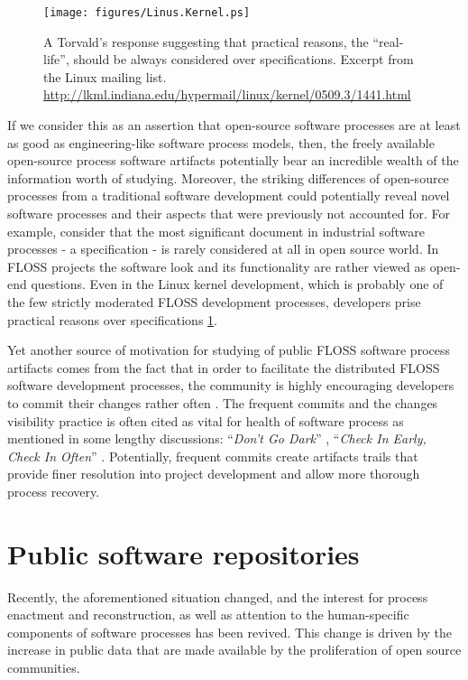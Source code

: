\begin{figure}[ht!]
   \centering
   \texttt{[image: figures/Linus.Kernel.ps]}
   \caption{A Torvald's response suggesting that practical reasons, the ``real-life'', should be always considered 
   over specifications.
   Excerpt from the Linux mailing list. \url{http://lkml.indiana.edu/hypermail/linux/kernel/0509.3/1441.html}}
   \label{fig:kernel}
\end{figure}

If we consider this as an assertion that open-source software processes are at least as good as engineering-like 
software process models, then, the freely available open-source process software artifacts potentially bear an 
incredible wealth of the information worth of studying. Moreover, the striking differences of open-source processes 
from a traditional software development could potentially reveal novel software processes and their aspects that 
were previously not accounted for. 
For example, consider that the most significant document in industrial software processes - a specification - 
is rarely considered at all in open source world. In FLOSS projects the software look and its functionality are 
rather viewed as open-end questions. Even in the Linux kernel development, which is probably one of the few strictly 
moderated FLOSS development processes, developers prise practical reasons over specifications 
\ref{fig:kernel}.

Yet another source of motivation for studying of public FLOSS software process artifacts comes from the fact that 
in order to facilitate the distributed FLOSS software development processes, the community is highly encouraging
developers to commit their changes rather often \cite{so-checkin} \cite{git-best-practices1}.
The frequent commits and the changes visibility practice is often cited as vital for health of software 
process as mentioned in some lengthy discussions: ``\textit{Don't Go Dark}'' \cite{checkin-dgd-2008}, 
``\textit{Check In Early, Check In Often}'' \cite{checkin-ch-2012}. Potentially, frequent commits create artifacts 
trails that provide finer resolution into project development and allow more thorough process recovery.

%
%
\section{Public software repositories}\label{section_public_repositories}
Recently, the aforementioned situation changed, and the interest for process enactment and reconstruction, 
as well as attention to the human-specific components of software processes has been revived. 
This change is driven by the increase in public data that are made available by the proliferation of open 
source communities.

